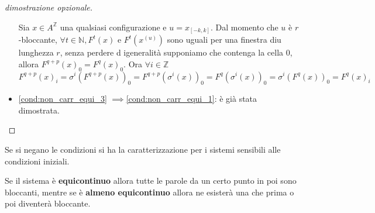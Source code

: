 \begin{teorema}
\begin{proof}[dimostrazione opzionale]
\begin{itemize}
                  Sia $x\in A^\mathbb{Z}$ una qualsiasi configurazione e $u=x_{[-k,k]}$.
                  Dal momento che $u$ è $r$-bloccante, $\forall t\in \mathbb{N}, F^t(x)$
                  e $ F^t(x^{(u)})$ sono uguali per una finestra diu lunghezza $r$,
                  senza perdere d igeneralità supponiamo che contenga la cella $0$, allora
                  $F^{q+p}(x)_0 = F^{q}(x)_0$. Ora $\forall i\in \mathbb{Z}$
                  $$F^{q+p}(x)_i = \sigma^i(F^{q+p}(x))_0 = F^{q+p}(\sigma^i(x))_0= F^{q}(\sigma^i(x))_0 = \sigma^i(F^{q}(x))_0 = F^{q}(x)_i$$

            \item \ref{cond:non_carr_equi_3} $\implies $\ref{cond:non_carr_equi_1}:
                  è già stata dimostrata.
        \end{itemize}
    \end{proof}
\end{teorema}
Se si negano le condizioni si ha la caratterizzazione per i sistemi sensibili
alle condizioni iniziali.

\begin{nota}
    Se il sistema è \textbf{equicontinuo} allora tutte le parole da un certo punto
    in poi sono bloccanti, mentre se è \textbf{almeno equicontinuo} allora ne esisterà
    una che prima o poi diventerà bloccante.
\end{nota}

